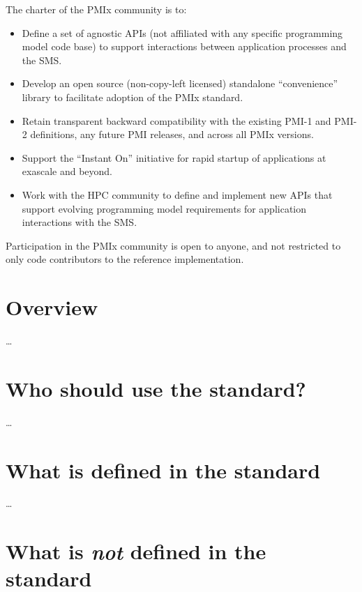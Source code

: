 The charter of the PMIx community is to:
\begin{itemize}
\item Define a set of agnostic APIs (not affiliated with any specific programming model code base) to support interactions between application processes and the \ac{SMS}.
\item Develop an open source (non-copy-left licensed) standalone ``convenience'' library to facilitate adoption of the \ac{PMIx} standard.
\item Retain transparent backward compatibility with the existing PMI-1 and PMI-2 definitions, any future \ac{PMI} releases, and across all \ac{PMIx} versions.
\item Support the ``Instant On'' initiative for rapid startup of applications at exascale and beyond.
\item Work with the \ac{HPC} community to define and implement new APIs that support evolving programming model requirements for application interactions with the \ac{SMS}.
\end{itemize}

Participation in the \ac{PMIx} community is open to anyone, and not restricted to only code contributors to the reference implementation. 


\section{Overview}

\ldots

\section{Who should use the standard?}

\ldots

\section{What is defined in the standard}

\ldots

\section{What is \emph{not} defined in the standard}

